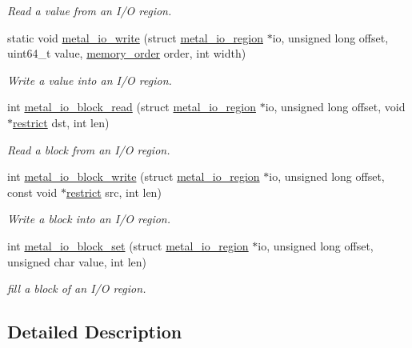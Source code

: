 \begin{DoxyCompactItemize}
\begin{DoxyCompactList}\small\item\em Read a value from an I/O region. \end{DoxyCompactList}\item 
static void \hyperlink{group__io_ga74ef56cd9b16bced8c2b8553956220b4}{metal\+\_\+io\+\_\+write} (struct \hyperlink{structmetal__io__region}{metal\+\_\+io\+\_\+region} $\ast$io, unsigned long offset, uint64\+\_\+t value, \hyperlink{compiler_2gcc_2atomic_8h_a17c2de5ae768960284c047a320f17d1b}{memory\+\_\+order} order, int width)
\begin{DoxyCompactList}\small\item\em Write a value into an I/O region. \end{DoxyCompactList}\item 
int \hyperlink{group__io_ga40c41a84ff9617bf1390328e42c82d8c}{metal\+\_\+io\+\_\+block\+\_\+read} (struct \hyperlink{structmetal__io__region}{metal\+\_\+io\+\_\+region} $\ast$io, unsigned long offset, void $\ast$\hyperlink{compiler_2iar_2compiler_8h_a080abdcb9c02438f1cd2bb707af25af8}{restrict} dst, int len)
\begin{DoxyCompactList}\small\item\em Read a block from an I/O region. \end{DoxyCompactList}\item 
int \hyperlink{group__io_ga2ab2be47ece49314a2b4417919dcc071}{metal\+\_\+io\+\_\+block\+\_\+write} (struct \hyperlink{structmetal__io__region}{metal\+\_\+io\+\_\+region} $\ast$io, unsigned long offset, const void $\ast$\hyperlink{compiler_2iar_2compiler_8h_a080abdcb9c02438f1cd2bb707af25af8}{restrict} src, int len)
\begin{DoxyCompactList}\small\item\em Write a block into an I/O region. \end{DoxyCompactList}\item 
int \hyperlink{group__io_gacdf04d26507dc0dae337b665496cd571}{metal\+\_\+io\+\_\+block\+\_\+set} (struct \hyperlink{structmetal__io__region}{metal\+\_\+io\+\_\+region} $\ast$io, unsigned long offset, unsigned char value, int len)
\begin{DoxyCompactList}\small\item\em fill a block of an I/O region. \end{DoxyCompactList}\end{DoxyCompactItemize}


\subsection{Detailed Description}


